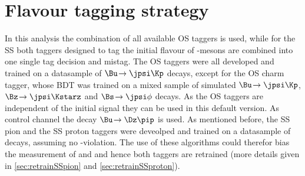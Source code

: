 \section{Flavour tagging strategy}
\label{sec:taggingstrategy}

In this analysis the combination of all available OS taggers is used, while for the SS both taggers designed to tag the initial flavour of \Bz-mesons are combined into one single tag decision and mistag.
The OS taggers were all developed and trained on a datasample of $\Bu\!\to\jpsi\Kp$ decays, except for the OS charm tagger, whose BDT was trained on a mixed sample of simulated $\Bu\!\to\jpsi\Kp$, $\Bz\!\to\jpsi\Kstarz$ and $\Bs\!\to\jpsi\phi$ decays.
As the OS taggers are independent of the initial signal \B they can be used in this default version.
As control channel the decay $\Bu\!\to\Dz\pip$ is used.
As mentioned before, the SS pion and the SS proton taggers were deveolped and trained on a datasample of \BdToDpi decays, assuming no \CP-violation.
The use of these algorithms could therefor bias the measurement of \Sf and \Sfbar and hence both taggers are retrained (more details given in \cref{sec:retrainSSpion} and \cref{sec:retrainSSproton}).

